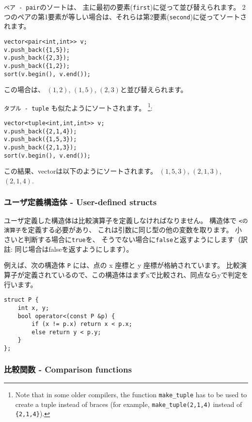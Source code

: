 \texttt{ペア - pair}のソートは、
主に最初の要素(\texttt{first})に従って並び替えられます。
2つのペアの第1要素が等しい場合は、それらは第2要素(\texttt{second})に従ってソートされます。

\begin{lstlisting}
vector<pair<int,int>> v;
v.push_back({1,5});
v.push_back({2,3});
v.push_back({1,2});
sort(v.begin(), v.end());
\end{lstlisting}
この場合は、
$(1,2)$, $(1,5)$, $(2,3)$と並び替えられます。


\texttt{タプル - tuple}
も似たようにソートされます。
\footnote{Note that in some older compilers,
the function \texttt{make\_tuple} has to be used to create a tuple instead of
braces (for example, \texttt{make\_tuple(2,1,4)} instead of \texttt{\{2,1,4\}}).}:
\begin{lstlisting}
vector<tuple<int,int,int>> v;
v.push_back({2,1,4});
v.push_back({1,5,3});
v.push_back({2,1,3});
sort(v.begin(), v.end());
\end{lstlisting}
この結果、vectorは以下のようにソートされます。
$(1,5,3)$, $(2,1,3)$, $(2,1,4)$.

\subsubsection{ユーザ定義構造体 - User-defined structs}

ユーザ定義した構造体は比較演算子を定義しなければなりません。
構造体で
\texttt{<の演算子}を定義する必要があり、
これは引数に同じ型の他の変数を取ります。
小さいと判断する場合に\texttt{true}を、
そうでない場合に\texttt{false}と返すようにします（訳註: 同じ場合はfalseを返すようにします）。

例えば、次の構造体 \texttt{P} には、点の x 座標と y 座標が格納されています。
比較演算子が定義されているので、この構造体はまずxで比較され、同点ならyで判定を行います。

\begin{lstlisting}
struct P {
    int x, y;
    bool operator<(const P &p) {
        if (x != p.x) return x < p.x;
        else return y < p.y;
    }
};
\end{lstlisting}

\subsubsection{比較関数 - Comparison functions}


